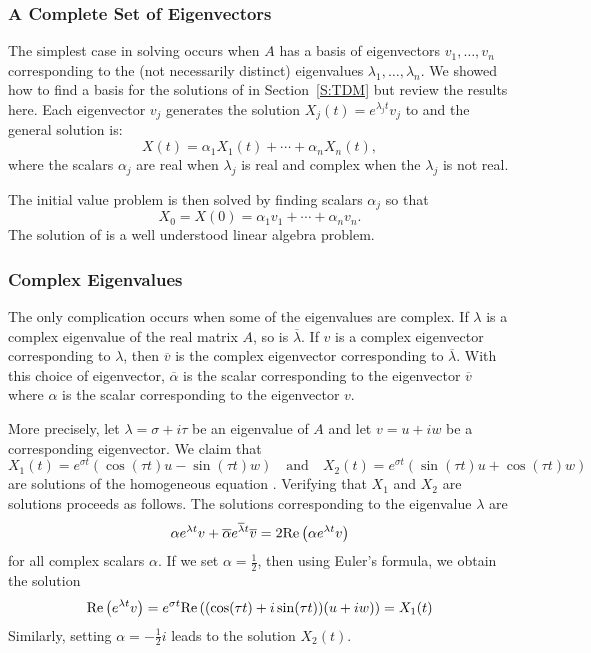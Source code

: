\subsubsection*{A Complete Set of Eigenvectors}

The simplest case in solving  occurs when $A$ has a basis of 
eigenvectors $v_1,\ldots,v_n$ corresponding to the (not necessarily distinct) 
eigenvalues $\lambda_1,\ldots,\lambda_n$.  We showed how to find a basis for
the solutions of  in Section~\ref{S:TDM} but review the results
here.  Each eigenvector $v_j$ generates the solution 
$X_j(t)=e^{\lambda_j t}v_j$ to  and the general solution is:
\begin{equation} \label{E:gensolns}
X(t) = \alpha_1 X_1(t) + \cdots + \alpha_nX_n(t),
\end{equation}
where the scalars $\alpha_j$ are real when $\lambda_j$ is real and complex
when the $\lambda_j$ is not real.  

The initial value problem is then solved 
by finding scalars $\alpha_j$ so that
\begin{equation}  \label{E:gensolnsic}
X_0 = X(0) =\alpha_1v_1 + \cdots + \alpha_nv_n.
\end{equation}
The solution of  is a well understood linear algebra 
problem.   

\subsubsection*{Complex Eigenvalues}

The only complication occurs when some of the eigenvalues are complex. 
If $\lambda$ is a complex eigenvalue of the real matrix $A$, so is 
$\overline{\lambda}$.  If $v$ is a complex eigenvector corresponding to 
$\lambda$, then $\overline{v}$ is the complex eigenvector corresponding to 
$\overline{\lambda}$.  With this choice of eigenvector, $\overline{\alpha}$ 
is the scalar corresponding to the eigenvector $\overline{v}$ where $\alpha$
is the scalar corresponding to the eigenvector $v$.

More precisely, let $\lambda = \sigma+i\tau$ be an eigenvalue of $A$ and 
let $v=u+iw$ be a corresponding eigenvector.  We claim that 
\begin{equation}  \label{eq:reimsol}
X_1(t) = e^{\sigma t}(\cos(\tau t)u - \sin(\tau t)w)\quad
\mbox{and}\quad
X_2(t) = e^{\sigma t}(\sin(\tau t)u + \cos(\tau t)w)
\end{equation}
are solutions of the homogeneous equation .  Verifying that
$X_1$ and $X_2$ are solutions proceeds as follows.  The solutions 
corresponding to the eigenvalue $\lambda$ are 
\[
\alpha e^{\lambda t}v + \overline{\alpha} e^{\overline{\lambda}t}\overline{v}
= 2{\rm Re}\left(\alpha e^{\lambda t}v\right)
\]
for all complex scalars $\alpha$.  If we set $\alpha=\frac{1}{2}$, then 
using Euler's formula, we obtain the solution 
\[
{\rm Re}\left(e^{\lambda t}v\right) = e^{\sigma t}{\rm Re}\left((\cos(\tau t)+i\sin(\tau t))(u + iw)\right)=X_1(t)
\]
Similarly, setting $\alpha=-\frac{1}{2}i$ leads to the solution $X_2(t)$.  


